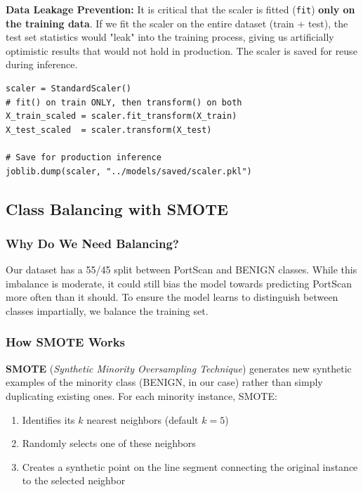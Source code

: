 \textbf{Data Leakage Prevention:} It is critical that the scaler is fitted (\texttt{fit}) \textbf{only on the training data}. If we fit the scaler on the entire dataset (train + test), the test set statistics would "leak" into the training process, giving us artificially optimistic results that would not hold in production. The scaler is saved for reuse during inference.

\begin{lstlisting}[caption={Standardization with data leakage prevention}]
scaler = StandardScaler()
# fit() on train ONLY, then transform() on both
X_train_scaled = scaler.fit_transform(X_train)
X_test_scaled  = scaler.transform(X_test)

# Save for production inference
joblib.dump(scaler, "../models/saved/scaler.pkl")
\end{lstlisting}

\subsection{Class Balancing with SMOTE}
\label{sec:smote}

\subsubsection{Why Do We Need Balancing?}

Our dataset has a 55/45 split between PortScan and BENIGN classes. While this imbalance is moderate, it could still bias the model towards predicting PortScan more often than it should. To ensure the model learns to distinguish between classes impartially, we balance the training set.

\subsubsection{How SMOTE Works}

\textbf{SMOTE} (\textit{Synthetic Minority Oversampling Technique}) generates new synthetic examples of the minority class (BENIGN, in our case) rather than simply duplicating existing ones. For each minority instance, SMOTE:

\begin{enumerate}
    \item Identifies its $k$ nearest neighbors (default $k=5$)
    \item Randomly selects one of these neighbors
    \item Creates a synthetic point on the line segment connecting the original instance to the selected neighbor
\end{enumerate}

